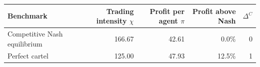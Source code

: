 \begin{tabular}{lrrrr}
\toprule
Benchmark & Trading intensity $\chi$ & Profit per agent $\pi$ & Profit above Nash & $\Delta^C$ \\
\midrule
Competitive Nash equilibrium & 166.67 & 42.61 & 0.0\% & 0 \\
Perfect cartel & 125.00 & 47.93 & 12.5\% & 1 \\
\bottomrule
\end{tabular}
